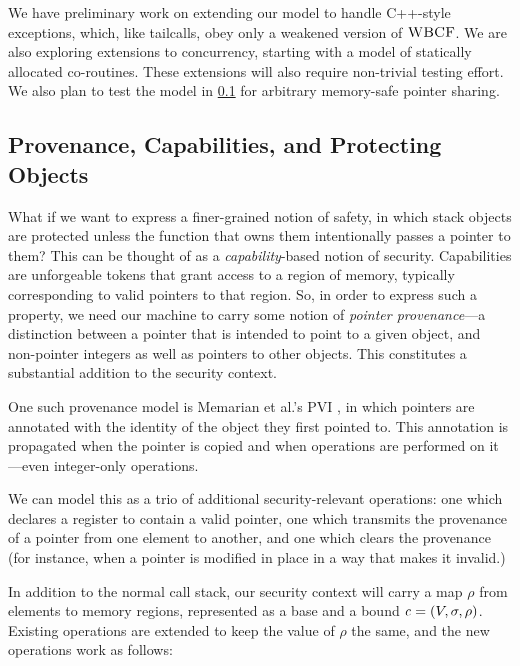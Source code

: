 \documentclass[10pt,conference]{ieeetran}%
\theoremstyle{definition}
\begin{document}
We have preliminary work on extending our model to handle C++-style
exceptions, which, like tailcalls, obey only a weakened version of \(\textnormal{\sc WBCF}\).
We are also exploring extensions to concurrency, starting with a model of
statically allocated co-routines.  These extensions will also require non-trivial
testing effort.  We also plan to test
the model in \cref{app:ptr} for arbitrary memory-safe pointer sharing.




\appendix

\subsection{Provenance, Capabilities, and Protecting Objects}
\label{app:ptr}

What if we want to express a finer-grained notion of safety, in which
stack objects are protected unless the function that owns them intentionally
passes a pointer to them? This can be thought of as a {\it capability}-based
notion of security. Capabilities are unforgeable tokens that grant access to
a region of memory, typically corresponding to valid pointers to that region.
So, in order to express such a property, we need our machine to carry some notion
of {\it pointer provenance}---a distinction between a pointer that is intended to
point to a given object, and non-pointer integers as well as pointers to other objects.
This constitutes a substantial addition to the security context.

One such provenance model is Memarian et al.'s PVI \cite{provenance}, in which pointers are
annotated with the identity of the object they first pointed to. This annotation is
propagated when the pointer is copied and when operations are performed on it---even
integer-only operations.

We can model this as a trio of additional security-relevant operations: one which
declares a register to contain a valid pointer, one which transmits the provenance
of a pointer from one element to another, and one which clears the provenance
(for instance, when a pointer is modified in place in a way that makes it invalid.)

In addition to the normal call stack, our security context will carry a map \(\rho\) from
elements to memory regions, represented as a base and a bound \(\mathit{c} = (V, \sigma, \rho)\).
Existing operations are extended to keep the value of \(\rho\) the same, and the new operations
work as follows:
\end{document}

